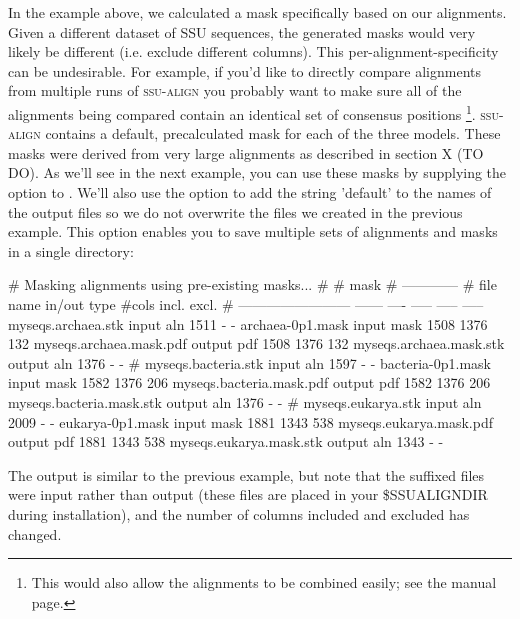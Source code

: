 In the  example above, we calculated a mask
specifically based on our  alignments. Given a different
dataset of SSU sequences, the generated masks would very likely be
different (i.e. exclude different columns). This
per-alignment-specificity can be undesirable. For example, if you'd
like to directly compare alignments from multiple runs of
\textsc{ssu-align} you probably want to make sure all of the
alignments being compared contain an identical set of consensus
positions \footnote{This would also allow the alignments to be combined
easily; see the  manual page.}. \textsc{ssu-align}
contains a default, precalculated mask for each of the three
models. These masks were derived from very large alignments as
described in section X (TO DO). As we'll see in the next example, you
can use these masks by supplying the  option to
. We'll also use the  option to add the
string 'default' to the names of the output files so we do not
overwrite the files we created in the previous example. This option
enables you to save multiple sets of alignments and masks in a single
directory:


\begin{sreoutput}
# Masking alignments using pre-existing masks...
#
#                                                    mask    
#                                                ------------
# file name                 in/out  type  #cols  incl.  excl.
# ------------------------  ------  ----  -----  -----  -----
  myseqs.archaea.stk         input   aln   1511      -      -
  archaea-0p1.mask           input  mask   1508   1376    132
  myseqs.archaea.mask.pdf   output   pdf   1508   1376    132
  myseqs.archaea.mask.stk   output   aln   1376      -      -
#
  myseqs.bacteria.stk        input   aln   1597      -      -
  bacteria-0p1.mask          input  mask   1582   1376    206
  myseqs.bacteria.mask.pdf  output   pdf   1582   1376    206
  myseqs.bacteria.mask.stk  output   aln   1376      -      -
#
  myseqs.eukarya.stk         input   aln   2009      -      -
  eukarya-0p1.mask           input  mask   1881   1343    538
  myseqs.eukarya.mask.pdf   output   pdf   1881   1343    538
  myseqs.eukarya.mask.stk   output   aln   1343      -      -
\end{sreoutput}

The output is similar to the previous example, but note that the
 suffixed files were input rather than output (these files
are placed in your \$SSUALIGNDIR during installation), and the number
of columns included and excluded has changed.

